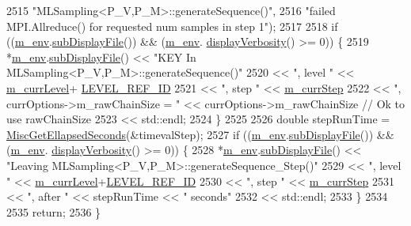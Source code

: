 \begin{DoxyCode}
2515                                    \textcolor{stringliteral}{"MLSampling<P\_V,P\_M>::generateSequence()"},
2516                                    \textcolor{stringliteral}{"failed MPI.Allreduce() for requested num samples in step 1"});
2517 
2518       \textcolor{keywordflow}{if} ((\hyperlink{class_q_u_e_s_o_1_1_m_l_sampling_a13f1ca4fe9f94822fe572a743eaced1d}{m\_env}.\hyperlink{class_q_u_e_s_o_1_1_base_environment_a8a0064746ae8dddfece4229b9ad374d6}{subDisplayFile}()) && (\hyperlink{class_q_u_e_s_o_1_1_m_l_sampling_a13f1ca4fe9f94822fe572a743eaced1d}{m\_env}.
      \hyperlink{class_q_u_e_s_o_1_1_base_environment_a1fe5f244fc0316a0ab3e37463f108b96}{displayVerbosity}() >= 0)) \{
2519         *\hyperlink{class_q_u_e_s_o_1_1_m_l_sampling_a13f1ca4fe9f94822fe572a743eaced1d}{m\_env}.\hyperlink{class_q_u_e_s_o_1_1_base_environment_a8a0064746ae8dddfece4229b9ad374d6}{subDisplayFile}() << \textcolor{stringliteral}{"KEY In MLSampling<P\_V,P\_M>::generateSequence()"}
2520                                 << \textcolor{stringliteral}{", level "} << \hyperlink{class_q_u_e_s_o_1_1_m_l_sampling_af9416874c856e50f3b35270e801f17e4}{m\_currLevel}+
      \hyperlink{_m_l_sampling_level_options_8h_a68d15eaf394d210effcf584b938206d3}{LEVEL\_REF\_ID}
2521                                 << \textcolor{stringliteral}{", step "}  << \hyperlink{class_q_u_e_s_o_1_1_m_l_sampling_a1b1f8ccb4823bdfa26ec652f0807c63e}{m\_currStep}
2522                                 << \textcolor{stringliteral}{", currOptions->m\_rawChainSize = "} << currOptions->m\_rawChainSize \textcolor{comment}{// Ok
       to use rawChainSize}
2523                                 << std::endl;
2524       \}
2525 
2526   \textcolor{keywordtype}{double} stepRunTime = \hyperlink{namespace_q_u_e_s_o_a424bc33f2e6e287fd468408d14b772ee}{MiscGetEllapsedSeconds}(&timevalStep);
2527   \textcolor{keywordflow}{if} ((\hyperlink{class_q_u_e_s_o_1_1_m_l_sampling_a13f1ca4fe9f94822fe572a743eaced1d}{m\_env}.\hyperlink{class_q_u_e_s_o_1_1_base_environment_a8a0064746ae8dddfece4229b9ad374d6}{subDisplayFile}()) && (\hyperlink{class_q_u_e_s_o_1_1_m_l_sampling_a13f1ca4fe9f94822fe572a743eaced1d}{m\_env}.
      \hyperlink{class_q_u_e_s_o_1_1_base_environment_a1fe5f244fc0316a0ab3e37463f108b96}{displayVerbosity}() >= 0)) \{
2528     *\hyperlink{class_q_u_e_s_o_1_1_m_l_sampling_a13f1ca4fe9f94822fe572a743eaced1d}{m\_env}.\hyperlink{class_q_u_e_s_o_1_1_base_environment_a8a0064746ae8dddfece4229b9ad374d6}{subDisplayFile}() << \textcolor{stringliteral}{"Leaving MLSampling<P\_V,P\_M>::generateSequence\_Step()"}
2529                             << \textcolor{stringliteral}{", level "} << \hyperlink{class_q_u_e_s_o_1_1_m_l_sampling_af9416874c856e50f3b35270e801f17e4}{m\_currLevel}+\hyperlink{_m_l_sampling_level_options_8h_a68d15eaf394d210effcf584b938206d3}{LEVEL\_REF\_ID}
2530                             << \textcolor{stringliteral}{", step "}  << \hyperlink{class_q_u_e_s_o_1_1_m_l_sampling_a1b1f8ccb4823bdfa26ec652f0807c63e}{m\_currStep}
2531                             << \textcolor{stringliteral}{", after "} << stepRunTime << \textcolor{stringliteral}{" seconds"}
2532                             << std::endl;
2533   \}
2534 
2535   \textcolor{keywordflow}{return};
2536 \}
\end{DoxyCode}
